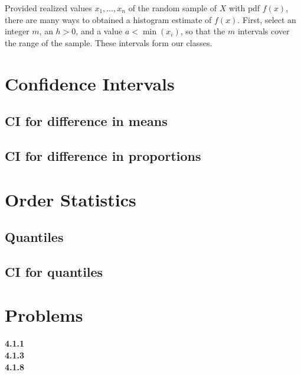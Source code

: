 \documentclass{book}
\theoremstyle{definition}
\begin{document}
Provided realized values $x_1,\dots,x_n$ of the random sample of $X$ with pdf $f(x)$, there are many ways to obtained a histogram estimate of $f(x)$. First, select an integer $m$, an $h > 0$, and a value $a < \min(x_i)$, so that the $m$ intervals cover the range of the sample. These intervals form our classes.  



\section{Confidence Intervals}
\subsection{CI for difference in means}
\subsection{CI for difference in proportions}


\section{Order Statistics}
\subsection{Quantiles}
\subsection{CI for quantiles}




\section{Problems}
\textbf{4.1.1}\\
\textbf{4.1.3}\\
\textbf{4.1.8}


	
	
\end{document}
